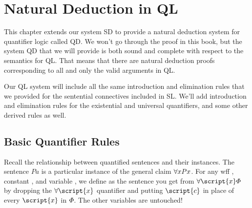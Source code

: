﻿%
\chapter{Natural Deduction in QL}
\label{ch.QLND}



This chapter extends our system SD to provide a natural deduction system for quantifier logic called QD.
We won't go through the proof in this book, but the system QD that we will provide is both sound and complete with respect to the semantics for QL.
That means that there are natural deduction proofs corresponding to all and only the valid arguments in QL.

Our QL system will include all the same introduction and elimination rules that we provided for the sentential connectives included in SL. 
We'll add introduction and elimination rules for the existential and universal quantifiers, and some other derived rules as well.


\section{Basic Quantifier Rules}


Recall the relationship between quantified sentences and their instances. The sentence $Pa$ is a particular instance of the general claim $\forall x Px$. For any wff \metaA{}, constant , and variable , we define  \metaA{} as the sentence you get from $\qt{\forall}{\script{x}}\metaA{}$ by dropping the $\qt{\forall}{\script{x}}$ quantifier and putting $\script{c}$ in place of every $\script{x}$ in $\varPhi{}$. The other variables are untouched! 

